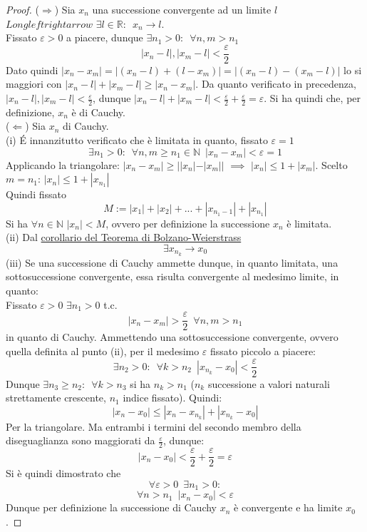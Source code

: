 \documentclass[10pt, oneside]{book}
\theoremstyle{plain}
\begin{document}
\begin{proof}
($\Rightarrow$) Sia $x_n$ una successione convergente ad un limite $l$ $Longleftrightarrow$ $\exists l \in \mathbb{R} : \enspace x_n \rightarrow l$. \\Fissato $\varepsilon > 0$ a piacere, dunque $\exists n_1 > 0 : \enspace \forall n,m > n_1$
\[|x_n - l|, |x_m - l| < \frac{\varepsilon}{2}\]
Dato quindi $|x_n - x_m| = |(x_n - l) + (l - x_m)| = |(x_n - l) - (x_m -l)|$ lo si maggiori con $|x_n - l| + |x_m - l| \geq |x_n - x_m|$. Da quanto verificato in precedenza, $|x_n - l|, |x_m - l| < \frac{\varepsilon}{2}$, dunque $|x_n - l| + |x_m - l| < \frac{\varepsilon}{2} + \frac{\varepsilon}{2} = \varepsilon$. Si ha quindi che, per definizione, $x_n$ è di Cauchy.
\\($\Leftarrow$) Sia $x_n$ di Cauchy.\\
(i) \'E innanzitutto verificato che è limitata in quanto, fissato $\varepsilon = 1$
\[\exists n_1 > 0 : \enspace \forall n,m \geq n_1 \in \mathbb{N} \enspace |x_n - x_m| < \varepsilon = 1 \]
Applicando la triangolare: $|x_n - x_m| \geq ||x_n| - |x_m||$ $\implies$ $|x_n| \leq 1 + |x_m|$. Scelto $m = n_1$: $|x_n| \leq 1 + |x_{n_1}|$\\
Quindi fissato 
\[M := |x_1| + |x_2| + ... + |x_{n_1 - 1}| + |x_{n_1}|\]
Si ha $\forall n \in \mathbb{N}$ $|x_n| < M$, ovvero per definizione la successione $x_n$ è limitata.\\
(ii) Dal \hyperlink{corollaier}{corollario del Teorema di Bolzano-Weierstrass} \[\exists x_{n_k} \longrightarrow x_0\]
(iii) Se una successione di Cauchy ammette dunque, in quanto limitata, una sottosuccessione convergente, essa risulta convergente al medesimo limite, in quanto:\\
Fissato $\varepsilon > 0$ $\exists n_1 > 0$ t.c.
\[|x_n - x_m| > \frac{\varepsilon}{2} \enspace \forall n, m > n_1\]
in quanto di Cauchy. Ammettendo una sottosuccessione convergente, ovvero quella definita al punto (ii), per il medesimo $\varepsilon$ fissato piccolo a piacere:
\[\exists n_2 > 0 : \enspace \forall k > n_2 \enspace |x_{n_k} - x_0| < \frac{\varepsilon}{2}\]
Dunque $\exists n_3 \geq n_2 : \enspace \forall k > n_3$ si ha $n_k > n_1$ ($n_k$ successione a valori naturali strettamente crescente, $n_1$ indice fissato). Quindi:
\[|x_n - x_0| \leq |x_n - x_{n_k}| + |x_{n_k} - x_0|\]
Per la triangolare. Ma entrambi i termini del secondo membro della diseguaglianza sono maggiorati da $\frac{\varepsilon}{2}$, dunque:
\[|x_n - x_0| < \frac{\varepsilon}{2} + \frac{\varepsilon}{2} = \varepsilon\]
Si è quindi dimostrato che 
\[\forall \varepsilon > 0 \enspace \exists n_1 > 0 :\]
\[\forall n > n_1 \enspace |x_n - x_0| < \varepsilon\]
Dunque per definizione la successione di Cauchy $x_n$ è convergente e ha limite $x_0$.
\end{proof}
\end{document}
